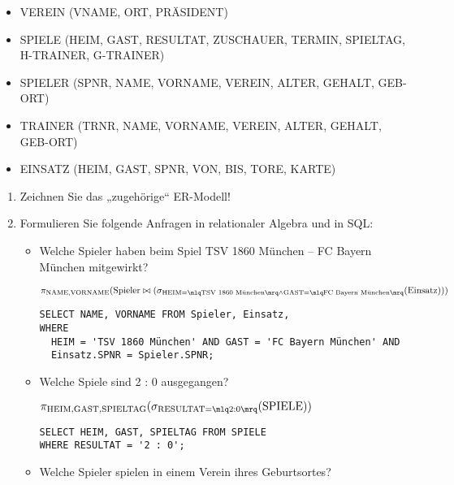 \documentclass{lehramt-informatik}
\begin{document}
\begin{itemize}
\item VEREIN (VNAME, ORT, PRÄSIDENT)
\item SPIELE (HEIM, GAST, RESULTAT, ZUSCHAUER, TERMIN, SPIELTAG, H-TRAINER,
G-TRAINER)
\item SPIELER (SPNR, NAME, VORNAME, VEREIN, ALTER, GEHALT, GEB-ORT)
\item TRAINER (TRNR, NAME, VORNAME, VEREIN, ALTER, GEHALT, GEB-ORT)
\item EINSATZ (HEIM, GAST, SPNR, VON, BIS, TORE, KARTE)
\end{itemize}

\begin{enumerate}
\item Zeichnen Sie das „zugehörige“ ER-Modell!

\item Formulieren Sie folgende Anfragen in relationaler Algebra und in
SQL:

\begin{itemize}
\item Welche Spieler haben beim Spiel TSV 1860 München – FC Bayern
München mitgewirkt?

\begin{antwort}
$\pi_{\text{NAME,VORNAME}}(
  \text{Spieler}
  \bowtie
  (\sigma_{
    \text{HEIM} = \mlq \text{TSV 1860 München} \mrq \land
    \text{GAST} = \mlq \text{FC Bayern München} \mrq
  }(\text{Einsatz}))
)$

\begin{verbatim}
SELECT NAME, VORNAME FROM Spieler, Einsatz,
WHERE
  HEIM = 'TSV 1860 München' AND GAST = 'FC Bayern München' AND
  Einsatz.SPNR = Spieler.SPNR;
\end{verbatim}
\end{antwort}

%

\item Welche Spiele sind 2 : 0 ausgegangen?

\begin{antwort}
$\pi_{\text{HEIM},\text{GAST},\text{SPIELTAG}}(\sigma_{\text{RESULTAT} = \mlq 2 : 0 \mrq}(\text{SPIELE}))$

\begin{verbatim}
SELECT HEIM, GAST, SPIELTAG FROM SPIELE
WHERE RESULTAT = '2 : 0';
\end{verbatim}
\end{antwort}

%

\item Welche Spieler spielen in einem Verein ihres Geburtsortes?


\end{itemize}
\end{enumerate}
\end{document}
